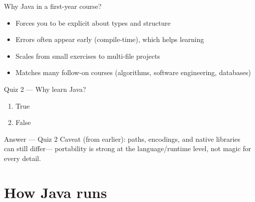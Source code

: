 \documentclass[aspectratio=169,11pt]{beamer}
\begin{document}
    \begin{frame}{Why Java in a first-year course?}
        \begin{itemize}
            \item Forces you to be explicit about types and structure
            \item Errors often appear early (compile-time), which helps learning
            \item Scales from small exercises to multi-file projects
            \item Matches many follow-on courses (algorithms, software engineering, databases)
        \end{itemize}
        \vspace{0.5em}
    \end{frame}

    \begin{frame}{Quiz 2 --- Why learn Java?}
        \begin{enumerate}
            \item True
            \item False
        \end{enumerate}
        \quizpause
    \end{frame}

    \begin{frame}{Answer --- Quiz 2}
        \vspace{0.4em}
        Caveat (from earlier): paths, encodings, and native libraries can still differ---
        portability is strong at the language/runtime level, not magic for every detail.
    \end{frame}

    \section{How Java runs}
\end{document}
